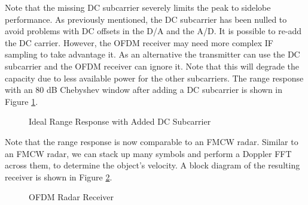\documentclass[conference]{IEEEtran}
\begin{document}
  	  	Note that the missing DC subcarrier severely limits the peak to sidelobe performance. As previously mentioned, the DC subcarrier has been nulled to avoid problems with DC offsets in the D/A and the A/D. It is possible to re-add the DC carrier. However, the OFDM receiver may need more complex IF sampling to take advantage it. As an alternative the transmitter can use the DC subcarrier and the OFDM receiver can ignore it. Note that this will degrade the capacity due to less available power for the other subcarriers. The range response with an 80 dB Chebyshev window after adding a DC subcarrier is shown in Figure \ref{fig::ofdm_radar_range_resp_with_zero_subcarrier}.
  	  	
  	  	\begin{figure}[H]
  	  		\centering
    			\caption{Ideal Range Response with Added DC Subcarrier}
    			\label{fig::ofdm_radar_range_resp_with_zero_subcarrier}
  	  	\end{figure}
  	  	
  	  	Note that the range response is now comparable to an FMCW radar. Similar to an FMCW radar, we can stack up many symbols and perform a Doppler FFT across them, to determine the object's velocity. A block diagram of the resulting receiver is shown in Figure \ref{fig::ofdm_radar_receiver}.
  	  	
  	  	\begin{figure}[H]
  	  		\centering
    			\caption{OFDM Radar Receiver}
    			\label{fig::ofdm_radar_receiver}
  	  	\end{figure}
  	  	
\end{document}
